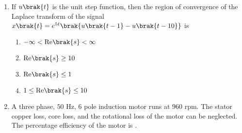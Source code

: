 \documentclass[journal,12pt,onecolumn]{IEEEtran}
\theoremstyle{remark}
\begin{document}
\begin{enumerate}[start=1, label=Q.\arabic*]
    \hfill{}
\item If $u\brak{t}$ is the unit step function, then the region of convergence  of the Laplace transform of the signal $x\brak{t} = e^{5t}\brak{u\brak{t-1} - u\brak{t-10}}$ is
    \begin{enumerate}
        \item $-\infty < \text{Re}\brak{s} < \infty$
        \item $\text{Re}\brak{s} \ge 10$
        \item $\text{Re}\brak{s} \le 1$
        \item $1 \le \text{Re}\brak{s} \le 10$
    \end{enumerate}

    \hfill{}

    \item A three phase, $50$ Hz, $6$ pole induction motor runs at $960$ rpm. The stator copper loss, core loss, and the rotational loss of the motor can be neglected. The percentage efficiency of the motor is \underline{\hspace{2cm}}.
    \begin{enumerate}
    \end{enumerate}

    \hfill{}


\end{enumerate}
\end{document}

